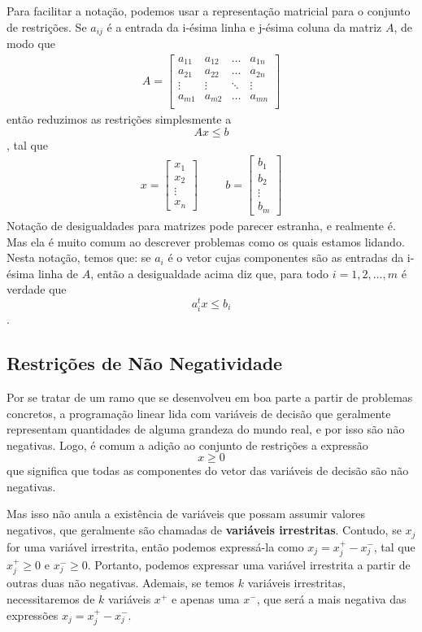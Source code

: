 Para facilitar a notação, podemos usar a representação matricial para o conjunto de restrições. Se $a_{ij}$ é a entrada da i-ésima linha e j-ésima coluna da matriz $A$, de modo que
\begin{gather*}
A = \begin{bmatrix}
	a_{11} & a_{12} & \ldots & a_{1n} \\
	a_{21} & a_{22} & \ldots & a_{2n} \\
	\vdots & \vdots & \ddots & \vdots \\
	a_{m1} & a_{m2} & \ldots & a_{mn} \\
\end{bmatrix}
\end{gather*}
então reduzimos as restrições simplesmente a \[Ax \leq b\], tal que
\begin{align*}
x = \begin{bmatrix}
	x_1 \\ x_2 \\ \vdots \\ x_n
\end{bmatrix}
\hspace{1cm}
b = \begin{bmatrix}
	b_1 \\ b_2 \\ \vdots \\ b_m
\end{bmatrix}
\end{align*}
Notação de desigualdades para matrizes pode parecer estranha, e realmente é. Mas ela é muito comum ao descrever problemas como os quais estamos lidando. Nesta notação, temos que: se $a_{i}$ é o vetor cujas componentes são as entradas da i-ésima linha de $A$, então a desigualdade acima diz que, para todo $i=1,2,\ldots,m$ é verdade que \[a^t_ix \leq b_i\].

\subsection{Restrições de Não Negatividade}
Por se tratar de um ramo que se desenvolveu em boa parte a partir de problemas concretos, a programação linear lida com variáveis de decisão que geralmente representam quantidades de alguma grandeza do mundo real, e por isso são não negativas. Logo, é comum a adição ao conjunto de restrições a expressão \[x \geq 0\]que significa que todas as componentes do vetor das variáveis de decisão são não negativas.

Mas isso não anula a existência de variáveis que possam assumir valores negativos, que geralmente são chamadas de \textbf{variáveis irrestritas}. Contudo, se $x_j$ for uma variável irrestrita, então podemos expressá-la como $x_j = x_j^+ - x_j^-$, tal que $x_j^+ \geq 0$ e $x_j^- \geq 0$. Portanto, podemos expressar uma variável irrestrita a partir de outras duas não negativas. Ademais, se temos $k$ variáveis irrestritas, necessitaremos de $k$ variáveis $x^+$ e apenas uma $x^-$, que será a mais negativa das expressões $x_j = x^+_j - x^-_j$. 

